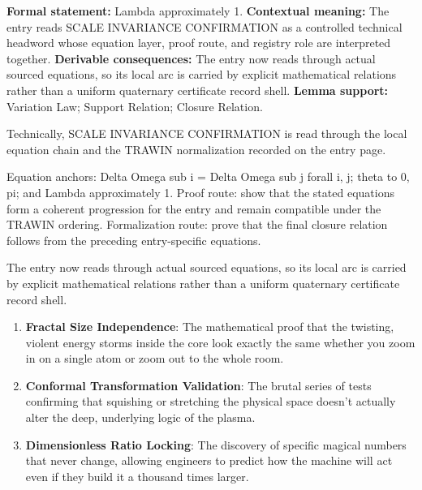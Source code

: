 \begingroup\footnotesize\setlength{\emergencystretch}{3em}\sloppy
\textbf{Formal statement:} Lambda approximately 1. \textbf{Contextual meaning:} The entry reads SCALE INVARIANCE CONFIRMATION as a controlled technical headword whose equation layer, proof route, and registry role are interpreted together. \textbf{Derivable consequences:} The entry now reads through actual sourced equations, so its local arc is carried by explicit mathematical relations rather than a uniform quaternary certificate record shell. \textbf{Lemma support:} Variation Law; Support Relation; Closure Relation.\par
\endgroup

Technically, SCALE INVARIANCE CONFIRMATION is read through the local equation chain and the TRAWIN normalization recorded on the entry page.

Equation anchors: Delta Omega sub i = Delta Omega sub j forall i, j; theta to 0, pi; and Lambda approximately 1. Proof route: show that the stated equations form a coherent progression for the entry and remain compatible under the TRAWIN ordering. Formalization route: prove that the final closure relation follows from the preceding entry-specific equations.

The entry now reads through actual sourced equations, so its local arc is carried by explicit mathematical relations rather than a uniform quaternary certificate record shell.
\endgroup

\begin{enumerate}[leftmargin=1.6em,itemsep=6pt,topsep=4pt]
\item \textbf{Fractal Size Independence}: The mathematical proof that the twisting, violent energy storms inside the core look exactly the same whether you zoom in on a single atom or zoom out to the whole room.
\item \textbf{Conformal Transformation Validation}: The brutal series of tests confirming that squishing or stretching the physical space doesn't actually alter the deep, underlying logic of the plasma.
\item \textbf{Dimensionless Ratio Locking}: The discovery of specific magical numbers that never change, allowing engineers to predict how the machine will act even if they build it a thousand times larger.
\end{enumerate}

